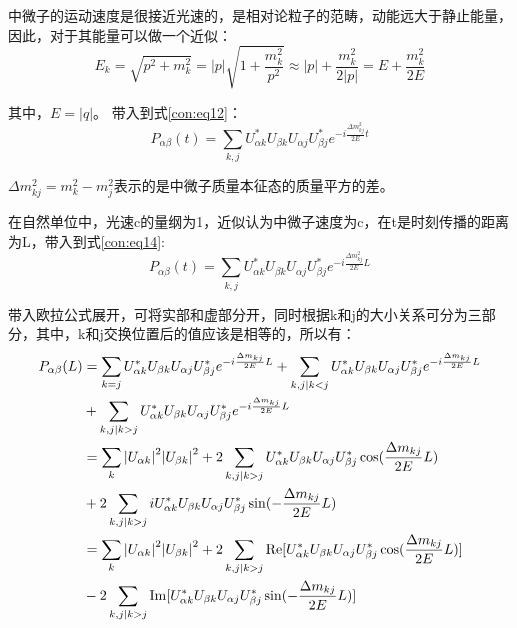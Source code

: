 \documentclass[10pt,a4paper]{article}
\begin{document}
中微子的运动速度是很接近光速的，是相对论粒子的范畴，动能远大于静止能量，因此，对于其能量可以做一个近似：
\begin{equation}
\label{con:eq13}
E_{k}=\sqrt{p^2+m_k^2}=|p|\sqrt{1+\frac{m_k^2}{p^2}}\approx |p|+\frac{m_k^2}{2|p|}=E+\frac{m_k^2}{2E}
\end{equation}


其中，$E=|q|$。
带入到式\eqref{con:eq12}：
\begin{equation}
\label{con:eq14}
P_{\alpha\beta}(t)=\sum_{k,j}U_{\alpha k}^{*}U_{\beta k}U_{\alpha j}U_{\beta j}^{*}e^{-i\frac{\Delta m_{kj}^2}{2E}t}
\end{equation}


$\Delta m_{kj}^2=m_k^2-m_j^2$表示的是中微子质量本征态的质量平方的差。


在自然单位中，光速c的量纲为1，近似认为中微子速度为c，在t是时刻传播的距离为L，带入到式\eqref{con:eq14}:
\begin{equation}
\label{con:eq15}
P_{\alpha\beta}(t)=\sum_{k,j}U_{\alpha k}^{*}U_{\beta k}U_{\alpha j}U_{\beta j}^{*}e^{-i\frac{\Delta m_{kj}^2}{2E}L}
\end{equation}


带入欧拉公式展开，可将实部和虚部分开，同时根据k和j的大小关系可分为三部分，其中，k和j交换位置后的值应该是相等的，所以有：
\begin{equation}
\label{con:eq16}
\begin{split}
P_{\alpha\beta}(L)&=\sum_{k=j}U_{\alpha k}^{*}U_{\beta k}U_{\alpha j}U_{\beta j}^{*}e^{-i\frac{\Delta m_{kj}}{2E}L}+\sum_{k,j |k<j}U_{\alpha k}^{*}U_{\beta k}U_{\alpha j}U_{\beta j}^{*}e^{-i\frac{\Delta m_{kj}}{2E}L}
\\&+\sum_{k,j |k>j}U_{\alpha k}^{*}U_{\beta k}U_{\alpha j}U_{\beta j}^{*}e^{-i\frac{\Delta m_{kj}}{2E}L}
\\&=\sum_{k}{|U_{\alpha k}|}^{2}{|U_{\beta k}|}^{2}+2\sum_{k,j |k>j}U_{\alpha k}^{*}U_{\beta k}U_{\alpha j}U_{\beta j}^{*}\cos(\frac{\Delta m_{kj}}{2E}L)
\\&+2\sum_{k,j |k>j}iU_{\alpha k}^{*}U_{\beta k}U_{\alpha j}U_{\beta j}^{*}\sin(-\frac{\Delta m_{kj}}{2E}L)
\\&=\sum_{k}{|U_{\alpha k}|}^{2}{|U_{\beta k}|}^{2}+2\sum_{k,j |k>j}{\rm Re}[U_{\alpha k}^{*}U_{\beta k}U_{\alpha j}U_{\beta j}^{*}\cos(\frac{\Delta m_{kj}}{2E}L)]
\\&-2\sum_{k,j |k>j}{\rm Im}[U_{\alpha k}^{*}U_{\beta k}U_{\alpha j}U_{\beta j}^{*}\sin(-\frac{\Delta m_{kj}}{2E}L)]
\end{split}
\end{equation}
\end{document}

